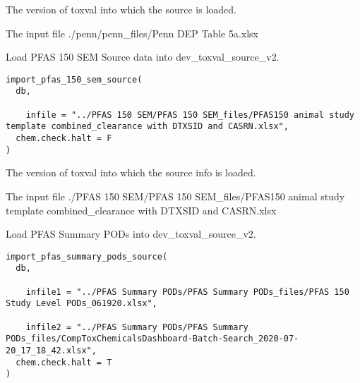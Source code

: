 \documentclass[letterpaper]{book}
\begin{document}
%
\begin{Arguments}
\begin{ldescription}
\item[\code{db}] The version of toxval into which the source is loaded.

\item[\code{infile}] The input file ./penn/penn\_files/Penn DEP Table 5a.xlsx
\end{ldescription}
\end{Arguments}
%
\begin{Description}\relax
Load PFAS 150 SEM Source data into dev\_toxval\_source\_v2.
\end{Description}
%
\begin{Usage}
\begin{verbatim}
import_pfas_150_sem_source(
  db,
 
    infile = "../PFAS 150 SEM/PFAS 150 SEM_files/PFAS150 animal study template combined_clearance with DTXSID and CASRN.xlsx",
  chem.check.halt = F
)
\end{verbatim}
\end{Usage}
%
\begin{Arguments}
\begin{ldescription}
\item[\code{db}] The version of toxval into which the source info is loaded.

\item[\code{infile}] The input file ./PFAS 150 SEM/PFAS 150 SEM\_files/PFAS150 animal study template combined\_clearance with DTXSID and CASRN.xlsx
\end{ldescription}
\end{Arguments}
%
\begin{Description}\relax
Load PFAS Summary PODs into dev\_toxval\_source\_v2.
\end{Description}
%
\begin{Usage}
\begin{verbatim}
import_pfas_summary_pods_source(
  db,
 
    infile1 = "../PFAS Summary PODs/PFAS Summary PODs_files/PFAS 150 Study Level PODs_061920.xlsx",
 
    infile2 = "../PFAS Summary PODs/PFAS Summary PODs_files/CompToxChemicalsDashboard-Batch-Search_2020-07-20_17_18_42.xlsx",
  chem.check.halt = T
)
\end{verbatim}
\end{Usage}
\end{document}
